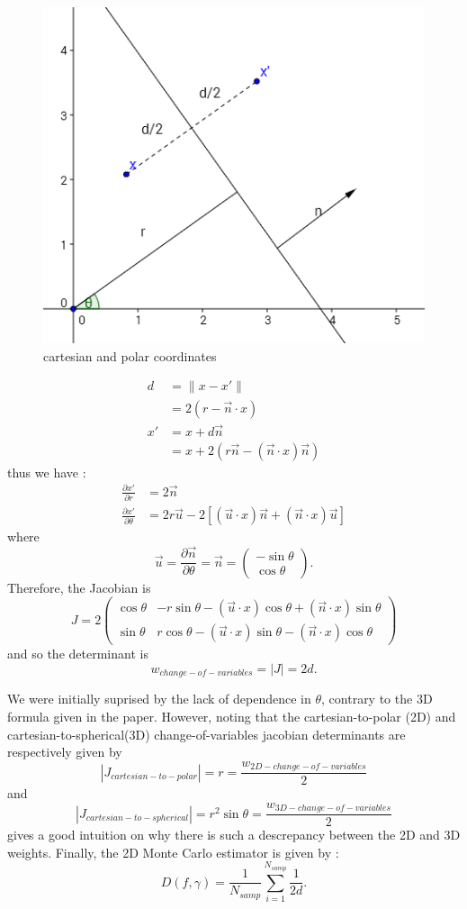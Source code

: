 \documentclass[10pt,a4paper]{article}                        %
\begin{document}
\begin{figure}
\includegraphics[scale=0.6]{img/definitions.png}
\caption{cartesian and polar coordinates}
\label{definitions}
\end{figure}

\begin{align*}
 d & = \lVert x-x' \rVert  \\
& = 2(r-\vec{n}\cdot x) \\
x' &= x+ d\vec{n}\\
&= x+ 2(r\vec{n} - (\vec{n}\cdot x)\vec{n})
\end{align*}
thus we have :
\begin{align*}
\frac{\partial x'}{\partial r}&=2\vec{n}\\
\frac{\partial x'}{\partial \theta}&= 2r\vec{u}-2[(\vec{u}\cdot x)\vec{n}+(\vec{n}\cdot x)\vec{u}]
\end{align*}
where 
\[\vec{u}=\frac{\partial \vec{n}}{\partial \theta} = \vec{n}=\begin{pmatrix}-\sin\theta \\ \cos\theta\end{pmatrix}.\]
Therefore, the Jacobian is
\[J = 2
\begin{pmatrix}
\cos\theta & -r\sin\theta-(\vec{u}\cdot x)\cos\theta+(\vec{n}\cdot x)\sin\theta\\
\sin\theta &  r \cos\theta - (\vec{u}\cdot x)\sin\theta - (\vec{n}\cdot x)\cos\theta
\end{pmatrix}\]
and so the determinant is
\[w_{change-of-variables} = |J| = 2d.\]

We were initially suprised by the lack of dependence in $\theta$, contrary to the 3D formula given in the paper. However, noting that the cartesian-to-polar (2D) and cartesian-to-spherical(3D) change-of-variables jacobian determinants are respectively given by \[|J_{cartesian-to-polar}| = r=\frac{w_{2D-change-of-variables}}{2}\] and \[|J_{cartesian-to-spherical}|=r^2\sin\theta=\frac{w_{3D-change-of-variables}}{2}\] gives a good intuition on why there is such a descrepancy between the 2D and 3D weights. Finally, the 2D Monte Carlo estimator is given by :\[D(f,\gamma) = \frac{1}{N_{samp}} \sum_{i=1}^{N_{samp}}\frac{1}{2d}.\]
\end{document}
